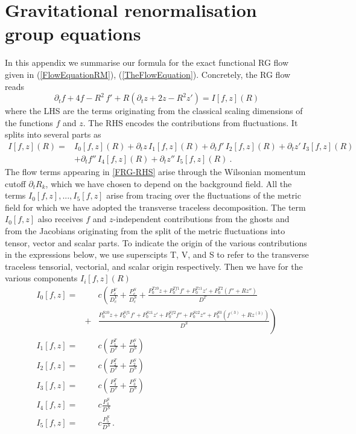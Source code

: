 \documentclass[notitlepage,eqsecnum,bm,amsmath,preprintnumbers,superscriptaddress,nofootinbib,aps,11pt]{revtex4-1}
\def\eq#1{(\ref{#1})}
\def\R{\rho}
\def\R{R}
\begin{document}
\section{\bf Gravitational renormalisation group equations}\label{AppFlow}
In this appendix we summarise our formula for the exact functional RG flow given in \eq{FlowEquationRM}, \eq{TheFlowEquation}. Concretely, the RG flow reads
\begin{equation}
\partial_t f+ 4 f-\R^2\,f'+\R\left(\partial_t z+2  z-\R^2  z' \right)=I[f,z](\R) \label{FRG}
\end{equation}
where the LHS are the terms originating from the classical scaling dimensions of the functions $f$ and $z$. The RHS encodes the contributions from fluctuations. It splits into several parts as
\newpage
\begin{equation}
\begin{split}
I[f,z](\R)=&I_0[f,z](\R)+\partial_tz\,I_1[f,z](\R)+\partial_tf'\,I_2[f,z](\R)+\partial_tz'\,I_3[f,z](\R)\\
&+\partial_tf''\,I_4[f,z](\R)+\partial_tz''\,I_5[f,z](\R)\ .\label{FRG-RHS}
\end{split}
\end{equation}
The flow terms appearing in \eqref{FRG-RHS} arise through the Wilsonian momentum cutoff $\partial_tR_k$, which we have chosen to depend on the background field. All the terms $I_0[f,z],...,I_5[f,z]$ arise from tracing over the fluctuations of the metric field for which we have adopted the transverse traceless decomposition. The term $I_0[f,z]$ also receives $f$ and $z$-independent contributions from the ghosts and from the Jacobians originating from the split of the metric fluctuations into tensor, vector and scalar parts. To indicate the origin of the various contributions in the expressions below, we use superscipts T, V, and S to refer to the transverse traceless tensorial, vectorial, and scalar origin respectively. Then we have for the various components $I_i[f,z](\R)$ 
\begin{eqnarray}
I_0[f,z]=&& c\left(\frac{P_c^V}{D_c^V}+\frac{P_c^S}{D_c^S}+\frac{P_0^{Tz0}z+P_0^{Tf1}f'+P_0^{Tz1}z'+P_0^{T2}(f''+\R z'')}{D^T} \right.\nonumber\\ 
&+& \left. \frac{P_0^{Sz0}z+P_0^{Sf1}f'+P_0^{Sz1}z'+P_0^{Sf2}f''+P_0^{Sz2}z''+P_0^{S3}(f^{(3)}+\R z^{(3)})}{D^S}\right)\label{I0}
\\ 
I_1[f,z]=&&c\left(\frac{P^{T}_1}{D^T}+\frac{P^S_1}{D^S}\right)
\\
I_2[f,z]=&&c\left(\frac{P^{T}_2}{D^T}+\frac{P^S_2}{D^S}\right)
\\
I_3[f,z]=&&c\left(\frac{P^{T}_3}{D^T}+\frac{P^S_3}{D^S}\right)\\
I_4[f,z]=&&c\frac{P^S_4}{D^S}\\
I_5[f,z]=&&c\frac{P^S_5}{D^S} \,.
\end{eqnarray}
\end{document}
